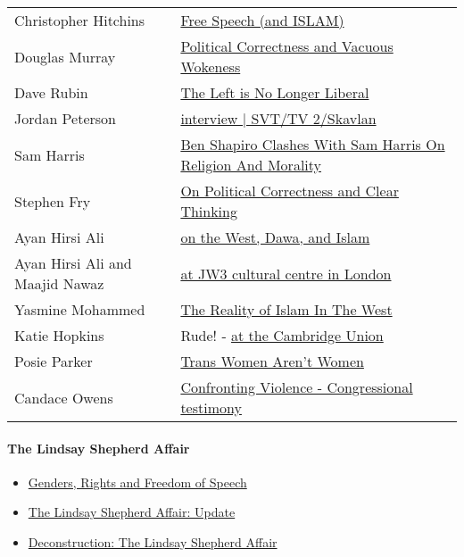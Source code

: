 \documentclass[14pt,titlepage]{extarticle}
\begin{document}
\begin{tabular}{l l}
Christopher Hitchins & \href{https://www.youtube.com/watch?v=4Z2uzEM0ugY}{Free Speech (and ISLAM)}\\
Douglas Murray & \href{https://www.youtube.com/watch?v=m2zZMg7SNWA}{Political Correctness and Vacuous Wokeness}\\
Dave Rubin & \href{https://www.youtube.com/watch?v=Tq86Beh3T70}{The Left is No Longer Liberal}\\
Jordan Peterson & \href{https://www.youtube.com/watch?v=_iudkPi4_sY}{interview | SVT/TV 2/Skavlan}\\
Sam Harris & \href{https://www.youtube.com/watch?v=Nb-o6NZiWrw&t=2001s}{\small Ben Shapiro Clashes With Sam Harris On Religion And Morality}\\
Stephen Fry & \href{https://www.youtube.com/watch?v=eJQHakkViPo}{On Political Correctness and Clear Thinking}\\
  Ayan Hirsi Ali & \href{https://www.youtube.com/watch?v=Bx2hEc7Dlcg}{on the West, Dawa, and Islam}\\
  Ayan Hirsi Ali and Maajid Nawaz & \href{https://www.youtube.com/watch?v=SV_GMeZ_XmA}{at JW3 cultural centre in London}\\
Yasmine Mohammed & \href{https://www.youtube.com/watch?v=_PXfMY6YqBY}{The Reality of Islam In The West}\\
Katie Hopkins & Rude! - \href{https://www.youtube.com/watch?v=vTo0crpK8Zs}{at the Cambridge Union}\\
Posie Parker & \href{https://www.youtube.com/watch?v=Pdpc2r4cBxQ}{Trans Women Aren't Women}\\
Candace Owens & \href{https://www.youtube.com/watch?v=MFQsjgXyJjk}{Confronting Violence - Congressional testimony}\\

\end{tabular}

\paragraph{The Lindsay Shepherd Affair}

\begin{itemize}
\item \href{https://www.youtube.com/watch?v=kasiov0ytEc&t=2625s}{Genders, Rights and Freedom of Speech}
\item \href{https://www.youtube.com/watch?v=PkNv4LFpGf4}{The Lindsay Shepherd Affair: Update}
\item \href{https://www.youtube.com/watch?v=YWVmDSMl30s}{Deconstruction: The Lindsay Shepherd Affair}
\end{itemize}
\end{document}
